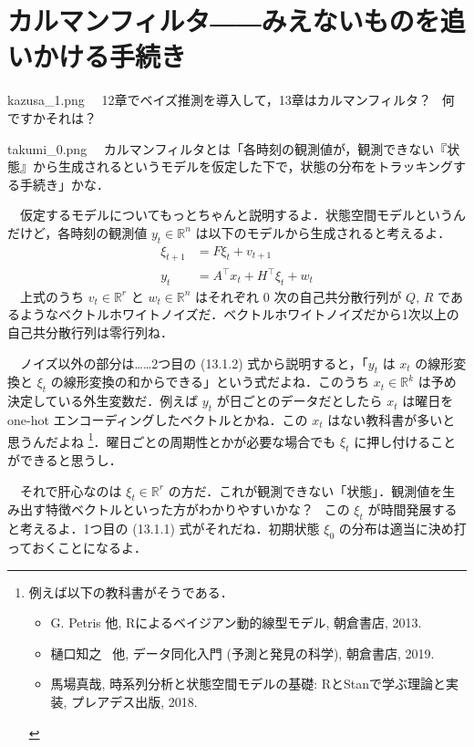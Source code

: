 \documentclass[b5paper,xelatex,ja=standard,10pt]{bxjsarticle}
\begin{document}


\section*{カルマンフィルタ――みえないものを追いかける手続き}
\vspace{3pt}


\begin{SERIFU}[colback=PaleIris]{kazusa_1.png}
　12章でベイズ推測を導入して，13章はカルマンフィルタ？ \, 何ですかそれは？
\end{SERIFU}


\begin{SERIFU}[colback=PaleGold]{takumi_0.png}
　カルマンフィルタとは「各時刻の観測値が，観測できない『状態』から生成されるというモデルを仮定した下で，状態の分布をトラッキングする手続き」かな．

　仮定するモデルについてもっとちゃんと説明するよ．{状態空間モデル}というんだけど，各時刻の観測値 $y_t \in \mathbb{R}^n$ は以下のモデルから生成されると考えるよ．
\begin{align}
\xi_{t+1} &= F \xi_t + v_{t + 1} \tag{13.1.1} \\
y_t &= A^\top x_t + H^\top \xi_t + w_t \tag{13.1.2}
\end{align}
　上式のうち $v_t \in \mathbb{R}^r$ と $w_t \in \mathbb{R}^n$ はそれぞれ 0 次の自己共分散行列が $Q, \, R$ であるようなベクトルホワイトノイズだ．ベクトルホワイトノイズだから1次以上の自己共分散行列は零行列ね．

　ノイズ以外の部分は……2つ目の (13.1.2) 式から説明すると，「$y_t$ は $x_t$ の線形変換と $\xi_t$ の線形変換の和からできる」という式だよね．このうち $x_t \in \mathbb{R}^k$ は予め決定している外生変数だ．例えば $y_t$ が日ごとのデータだとしたら $x_t$ は曜日を one-hot エンコーディングしたベクトルとかね．この $x_t$ はない教科書が多いと思うんだよね
\footnote{{例えば以下の教科書がそうである．\begin{itemize} \item G. Petris 他, Rによるベイジアン動的線型モデル, 朝倉書店, 2013. \item 樋口知之 \, 他, データ同化入門 (予測と発見の科学), 朝倉書店, 2019. \item 馬場真哉, 時系列分析と状態空間モデルの基礎: RとStanで学ぶ理論と実装, プレアデス出版, 2018. \end{itemize}}}．曜日ごとの周期性とかが必要な場合でも $\xi_t$ に押し付けることができると思うし．

　それで肝心なのは $\xi_t \in \mathbb{R}^r$ の方だ．これが観測できない「状態」．観測値を生み出す特徴ベクトルといった方がわかりやすいかな？ \, この $\xi_t$ が時間発展すると考えるよ．1つ目の (13.1.1) 式がそれだね．初期状態 $\xi_0$ の分布は適当に決め打っておくことになるよ．
\end{SERIFU}
\end{document}
